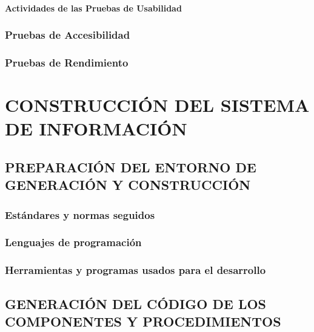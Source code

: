 \documentclass[11pt]{report}
\begin{document}
\subsubsection{Actividades de las Pruebas de Usabilidad} 


\subsection{Pruebas de Accesibilidad} 

\subsection{Pruebas de Rendimiento} 


\newpage
\chapter{CONSTRUCCIÓN DEL SISTEMA DE INFORMACIÓN}
\noindent{}

\newpage


\section{PREPARACIÓN DEL ENTORNO DE GENERACIÓN Y CONSTRUCCIÓN}

\subsection{Estándares y normas seguidos}


\subsection{Lenguajes de programación}


\subsection{Herramientas y programas usados para el desarrollo}


\newpage
\section{GENERACIÓN DEL CÓDIGO DE LOS COMPONENTES Y PROCEDIMIENTOS}
\end{document}

